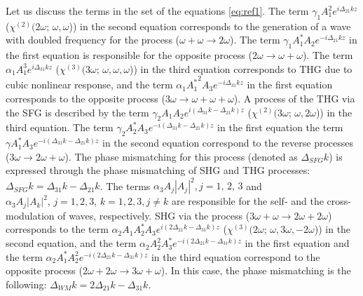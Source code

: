 \documentclass[a4paper, 12pt, onecolumn]{extarticle}
\begin{document}
Let us discuss the terms in the set of the equations \eqref{eq:ref1}. The term \(\gamma_1 A_1^2e^{i\Delta_{21} kz}\) (\(\chi^{(2)}(2\omega;\,\omega,\omega\))) in the second equation corresponds to the generation of a wave with doubled frequency for the process (\(\omega+\omega\rightarrow2\omega\)). The term \(\gamma_1  A_1^* A_2e^{-i\Delta_{21} kz}\) in the first equation is responsible for the opposite process (\(2\omega \rightarrow \omega+\omega\)). The term \(\alpha_1 A_1^3e^{i\Delta_{31}kz}\) (\(\chi^{(3)}(3\omega;\,\omega,\omega,\omega\))) in the third equation corresponds to THG due to cubic nonlinear response, and the term \(\alpha_1 {A_1^*}^2 A_3 e^{-i\Delta_{31}kz}\) in the first equation corresponds to the opposite process (\(3\omega\rightarrow\omega+\omega+\omega\)). A process of the THG via the SFG is described by the term \(\gamma_2 A_1 A_2e^{i(\Delta_{31}k-\Delta_{21}k)z}\) (\(\chi^{(2)}(3\omega;\,\omega,2\omega\))) in the third equation. The term \(\gamma_2 A_2^* A_3e^{-i(\Delta_{31}k-\Delta_{21}k)z}\) in the first equation the term \(\gamma A_1^* A_3e^{-i(\Delta_{31}k-\Delta_{21}k)z}\) in the second equation correspond to the reverse processes (\(3\omega\rightarrow2\omega+\omega\)). The phase mismatching for this process (denoted as \(\Delta_{SFG}k\)) is expressed through the phase mismatching of SHG and THG processes: \(\Delta_{SFG}k=\Delta_{31}k-\Delta_{21}k\). The terms \(\alpha_3 A_j|A_j|^2, j=1,\,2,\,3\) and \(\alpha_3 A_j|A_k|^2,\,j=1,2,3,\,k=1,2,3,j\ne k\) are responsible for the self- and the cross-modulation of waves, respectively. SHG via the process (\(3\omega+\omega\rightarrow2\omega+2\omega\)) corresponds to the term \(\alpha_2 A_1A_2^*A_3e^{i(2\Delta_{21}k-\Delta_{31}k )z}\) (\(\chi^{(3)}(2\omega;\,\omega,3\omega,-2\omega\))) in the second equation, and the term \(\alpha_2 A_2^2 A_3^*e^{-i(2\Delta_{21}k-\Delta_{31}k )z}\) in the first equation and the term \(\alpha_2 A_1^* A_2^2 e^{-i(2\Delta_{21}k-\Delta_{31}k )z}\) in the third equation correspond to the opposite process (\(2\omega+2\omega\rightarrow3\omega+\omega\)). In this case, the phase mismatching is the following: \(\Delta_{WM}k=2\Delta_{21}k-\Delta_{31}k\).
\end{document}
